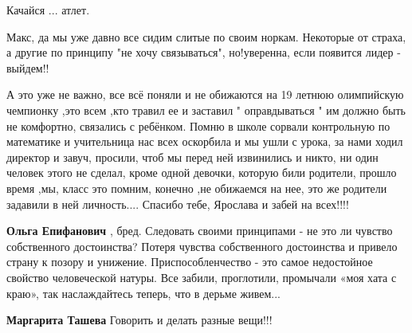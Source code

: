 \begin{itemize}
Качайся ... атлет.


Макс, да мы уже давно все сидим слитые по своим норкам. Некоторые от страха, а
другие по принципу "не хочу связываться", но!уверенна, если появится лидер -
выйдем!!


 

А это уже не важно, все всё поняли и не обижаются на 19 летнюю олимпийскую
чемпионку ,это всем ,кто травил ее и заставил " оправдываться " им должно быть
не комфортно, связались с ребёнком. Помню в школе сорвали контрольную по
математике и учительница нас всех оскорбила и мы ушли с урока, за нами ходил
директор и завуч, просили, чтоб мы перед ней извинились и никто, ни один человек
этого не сделал, кроме одной девочки, которую били родители, прошло время
,мы, класс это помним, конечно ,не обижаемся на нее, это же родители задавили в
ней личность.... Спасибо тебе, Ярослава и забей на всех!!!!

\begin{itemize}
 
\textbf{Ольга Епифанович} , бред. Следовать своими принципами - не это ли
чувство собственного достоинства? Потеря чувства собственного достоинства и
привело страну к позору и унижение. Приспособленчество - это самое недостойное
свойство человеческой натуры. Все забили, проглотили, промычали «моя хата с
краю», так наслаждайтесь теперь, что в дерьме живем...

 
\textbf{Маргарита Ташева} Говорить и делать разные вещи!!!
\end{itemize}


\end{itemize}
